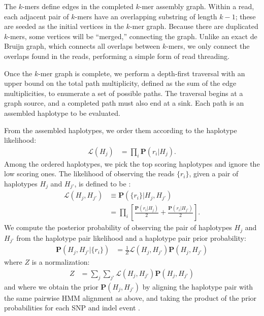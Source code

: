 \documentclass{acm_proc_article-sp}
\begin{document}
The $k$-mers define edges in the completed $k$-mer assembly graph.
Within a read, each adjacent pair of $k$-mers have an overlapping substring of
length $k-1$;
these are seeded as the initial vertices in the $k$-mer graph.
Because there are duplicated $k$-mers, some vertices will be ``merged,''
connecting the graph.
Unlike an exact de Bruijn graph, which connects all overlaps between $k$-mers,
we only connect the overlaps found in the reads, performing a simple form of
read threading.

Once the $k$-mer graph is complete, we perform a depth-first traversal with an
upper bound on the total path multiplicity, defined as the sum of the edge
multiplicities, to enumerate a set of possible paths.
The traversal begins at a graph source, and a completed path must also end at a
sink.
Each path is an assembled haplotype to be evaluated.

From the assembled haplotypes, we order them according to the haplotype
likelihood:
\begin{align}
  \mathcal L(H_j)
  &=\prod_i\mathbf P(r_i|H_j).
\end{align}
Among the ordered haplotypes, we pick the top scoring haplotypes and ignore
the low scoring ones.
The likelihood of observing the reads $\{r_i\}$, given a pair of haplotypes
$H_j$ and $H_{j'}$, is defined to be \cite{albers11}:
\begin{align}
  \mathcal L(H_j,H_{j'})
  &\equiv\mathbf P(\{r_i\}|H_j,H_{j'}) \\ \nonumber
  &=\prod_i\left[ \frac{\mathbf P(r_i|H_j) }{2} + \frac{\mathbf P(r_i|H_{j'})}{2} \right].
\end{align}
We compute the posterior probability of observing the pair of haplotypes
$H_j$ and $H_{j'}$ from the haplotype pair likelihood and a haplotype pair
prior probability:
\begin{align}
  \mathbf P (H_j,H_{j'}|\{r_i\})&=\frac{1}{Z}\mathcal L(H_j,H_{j'})\mathbf P(H_j,H_{j'})
\end{align}
where $Z$ is a normalization:
\begin{align*}
  Z&=\sum_j\sum_{j'}\mathcal L(H_j,H_{j'})\mathbf P(H_j,H_{j'})
\end{align*}
and where we obtain the prior $\mathbf P (H_j,H_{j'})$ by aligning the haplotype
pair with the same pairwise HMM alignment as above, and taking the product of
the prior probabilities for each SNP and indel event
\cite{albers11}.
\end{document}

